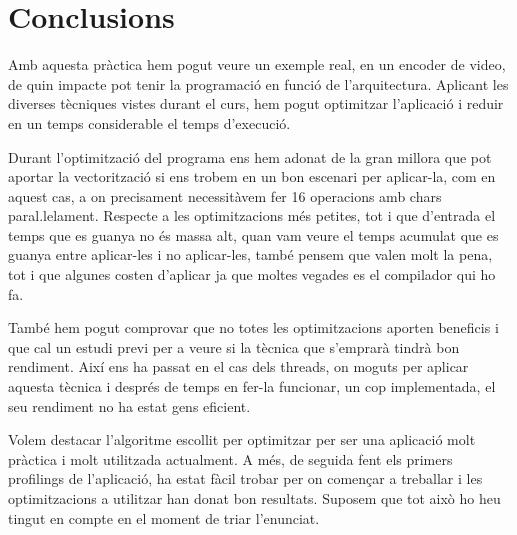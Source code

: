 \chapter{Conclusions}

Amb aquesta pràctica hem pogut veure un exemple real, en un encoder de video, de quin impacte pot tenir la programació en funció de l'arquitectura. Aplicant les diverses tècniques vistes durant el curs, hem pogut optimitzar l'aplicació i reduir en un temps considerable el temps d'execució.

Durant l'optimització del programa ens hem adonat de la gran millora que pot aportar la vectorització si ens trobem en un bon escenari per aplicar-la, com en aquest cas, a on precisament necessitàvem fer 16 operacions amb chars paral.lelament. Respecte a les optimitzacions més petites, tot i que d'entrada el temps que es guanya no és massa alt, quan vam veure el temps acumulat que es guanya entre aplicar-les i no aplicar-les, també pensem que valen molt la pena, tot i que algunes costen d'aplicar ja que moltes vegades es el compilador qui ho fa.

També hem pogut comprovar que no totes les optimitzacions aporten beneficis i que cal un estudi previ per a veure si la tècnica que s'emprarà tindrà bon rendiment. Així ens ha passat en el cas dels threads, on moguts per aplicar aquesta tècnica i després de temps en fer-la funcionar, un cop implementada, el seu rendiment no ha estat gens eficient. 

Volem destacar l'algoritme escollit per optimitzar per ser una aplicació molt pràctica i molt utilitzada actualment. A més, de seguida fent els primers profilings de l'aplicació, ha estat fàcil trobar per on començar a treballar i les optimitzacions a utilitzar han donat bon resultats. Suposem que tot això ho heu tingut en compte en el moment de triar l'enunciat.
